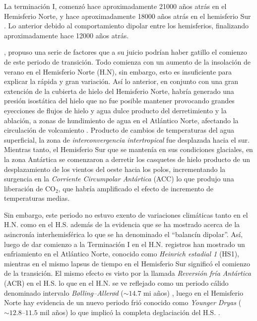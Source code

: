 La terminación I, comenzó hace aproximadamente 21000 años atrás en el Hemisferio Norte, y hace aproximadamente 18000 años atrás en el hemisferio Sur \citep{denton2010last,clark2009last,lynch2007atlantic}.  Lo anterior debido al comportamiento dipolar entre los hemisferios, finalizando aproximadamente hace 12000 años atrás. 

\cite{denton2010last}, propuso una serie de factores que a su juicio podrían haber gatillo el comienzo de este periodo de transición. Todo comienza con un aumento de la insolación de verano en el Hemisferio Norte (H.N), sin embargo, esto es insuficiente para explicar la rápida y gran variación. Así lo anterior, en conjunto con una gran extención de la cubierta de hielo del Hemisferio Norte, habría generado una presión isostática del hielo que no fue posible mantener provocando grandes eyecciones de flujos de hielo y agua dulce producto del derretimiento y la ablación, a zonas de hundimiento de agua en el Atlántico Norte, afectando la circulación de volcamiento \citep{ferrari2014antarctic}. Producto de cambios de temperaturas del agua superficial, la zona de \textit{interconvergencia intertropical}
fue desplazada hacia el sur. Mientras tanto, el Hemisferio Sur que se mantenía en sus condiciones glaciales, en la zona Antártica se comenzaron a derretir los casquetes de hielo producto de un desplazamiento de los vientos del oeste hacia los polos, incrementando la surgencia en la \textit{Corriente Circumpolar Antártica} (ACC) lo que produjo una liberación de CO$_2$, que habría amplificado el efecto de incremento de temperaturas medias. 

Sin embargo, este periodo no estuvo exento de variaciones climáticas tanto en el H.N. como en el H.S. además de la evidencia que se ha mostrado acerca de la asincronía interhemisférica lo que se ha denominado el ``balancín dipolar''. Así, luego de dar comienzo a la Terminación I en el H.N. registros han mostrado un enfriamiento en el Atlántico Norte, conocido como \textit{Heinrich estadial 1} (HS1), mientras en el mismo lapsus de tiempo en el Hemisferio Sur significó el comienzo de la transición. El mismo efecto es visto por la llamada \textit{Reversión fría Antártica} (ACR) en el H.S. lo que en el H.N. se ve reflejado como un periodo cálido denominado intervalo \textit{Bølling–Allerød} ($\sim 14.7$ mi años) \citep{renssen2001two}, luego en el Hemisferio Norte hay evidencia de un nuevo periodo frió conocido como \textit{Younger Dryas} ($\sim 12.8–11.5$ mil años) lo que implicó la completa deglaciación del H.S. \citep{denton2010last,barker2009interhemispheric}.


